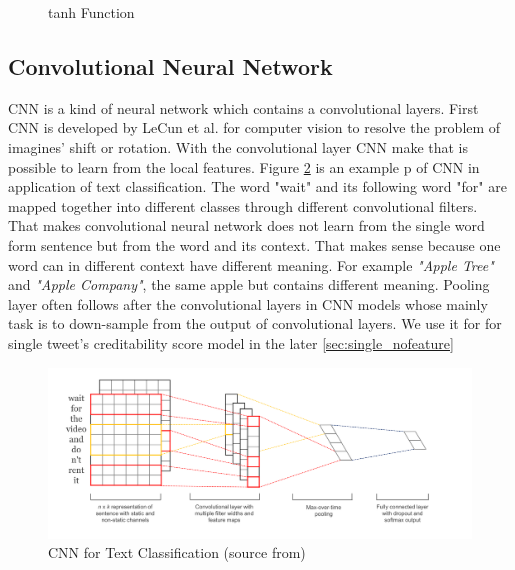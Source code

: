  \begin{figure}[h]
\center
{}
   \caption{tanh Function}
\label{fig:tanh}
\end{figure}
\newpage
 \subsection{Convolutional Neural Network} %
CNN is a kind of neural network which contains a convolutional layers. First CNN is developed by LeCun et al. \cite{lecun1989backpropagation} for computer vision to resolve the problem of imagines' shift or rotation. With the convolutional layer CNN make that is possible to learn from the local features. Figure \ref{fig:cnn2} is an example p of CNN in application of text classification. The word "wait" and its following word "for" are mapped together into different classes through different convolutional filters. That makes convolutional neural network does not learn from the single word form sentence but from the word and its context. That makes sense because one word can in different context have different meaning. For example \emph{"Apple Tree"} and \emph{"Apple Company"}, the same apple but contains different meaning. 
 Pooling layer often follows after the convolutional layers in CNN models whose mainly task is to down-sample from the output of convolutional layers.  We use it for for single tweet's creditability score model in the later  \ref{sec:single_nofeature}
   


 \begin{figure}[!h]
\centering
\includegraphics[width=1\columnwidth]{images/CNN.png}
\caption{CNN for Text Classification (source from\cite{kim2014convolutional}) }
\label{fig:cnn2}
\end{figure}



